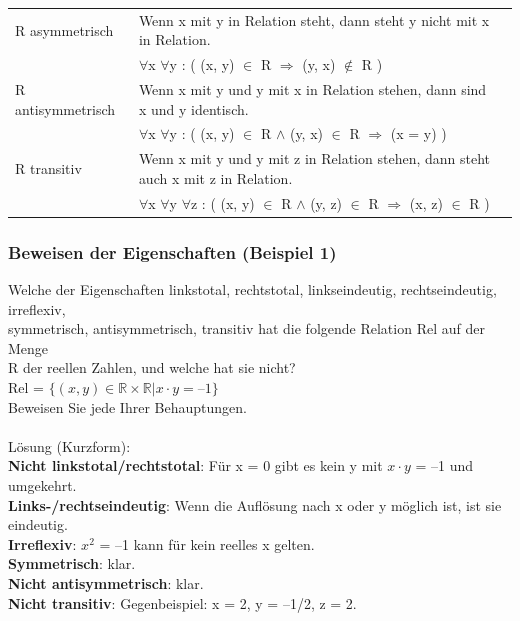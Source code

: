 \documentclass[6pt,a4paper]{scrartcl}
\begin{document}
\begin{multicols*}{2}
\begin{tabular}{lll}
R asymmetrisch		& Wenn x mit y in Relation steht, dann steht y nicht mit x in Relation.							\\
& $\forall$x $\forall$y : ( (x, y) $\in$ R $\Rightarrow$ (y, x) $\notin$ R ) \\
R antisymmetrisch	& Wenn x mit y und y mit x in Relation stehen, dann sind x und y identisch.						\\
& $\forall$x $\forall$y : ( (x, y) $\in$ R $\land$ (y, x) $\in$ R $\Rightarrow$ (x = y) ) \\
R transitiv			& Wenn x mit y und y mit z in Relation stehen, dann steht auch x mit z in Relation.				\\
& $\forall$x $\forall$y $\forall$z : ( (x, y) $\in$ R $\land$ (y, z) $\in$ R $\Rightarrow$ (x, z) $\in$ R ) \\
\end{tabular}

\subsubsection{Beweisen der Eigenschaften (Beispiel 1)}
Welche der Eigenschaften linkstotal, rechtstotal, linkseindeutig, rechtseindeutig, irreflexiv,\\
symmetrisch, antisymmetrisch, transitiv hat die folgende Relation Rel auf der Menge\\
R der reellen Zahlen, und welche hat sie nicht?\\
Rel = $\{ (x, y) \in \mathbb{R} \times \mathbb{R} | x \cdot y = –1 \}$\\
Beweisen Sie jede Ihrer Behauptungen.\\
\\
Lösung (Kurzform):\\
\textbf{Nicht linkstotal/rechtstotal}: Für x = 0 gibt es kein y mit $x \cdot y$ = –1 und umgekehrt.\\
\textbf{Links-/rechtseindeutig}: Wenn die Auflösung nach x oder y möglich ist, ist sie eindeutig.\\
\textbf{Irreflexiv}: $x^2$ = –1 kann für kein reelles x gelten.\\
\textbf{Symmetrisch}: klar.\\
\textbf{Nicht antisymmetrisch}: klar.\\
\textbf{Nicht transitiv}: Gegenbeispiel: x = 2, y = –1/2, z = 2.\\


\end{multicols*}
\end{document}
